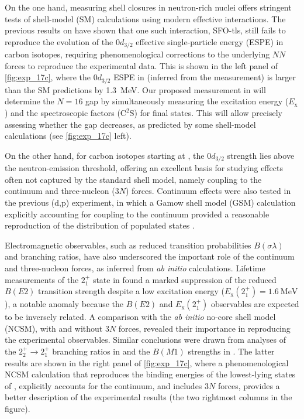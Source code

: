\documentclass[a4paper, 10pt]{article}
\newcommand{\iso}[2]{\ce{^{#1}#2}}
\newcommand{\ex}{\ensuremath{E_{\text{x}}}\xspace}
\newcommand{\ctwos}{\ensuremath{\text{C}^2\text{S}}\xspace}
\begin{document}
On the one hand, measuring shell closures in neutron-rich nuclei offers stringent tests of shell-model (SM) calculations using modern effective interactions. The previous results on \iso{17}{C} have shown that one such interaction, SFO-tls, still fails to reproduce the evolution of the $0d_{3/2}$ effective single-particle energy (ESPE) in carbon isotopes, requiring phenomenological corrections to the underlying $NN$ forces to reproduce the experimental data. This is shown in the left panel of \autoref{fig:exp_17c}, where the $0d_{3/2}$ ESPE in \iso{16}{C} (inferred from the \iso{17}{C} measurement) is larger than the SM predictions by \qty{1.3}{\MeV}. Our proposed measurement in \iso{18}{C} will determine the $N=16$ gap by simultaneously measuring the excitation energy (\ex) and the spectroscopic factors (\ctwos) for final states. This will allow precisely assessing whether the gap decreases, as predicted by some shell-model calculations (see \autoref{fig:exp_17c} left).

On the other hand, for carbon isotopes starting at \iso{15}{C}, the $0d_{3/2}$ strength lies above the neutron-emission threshold, offering an excellent basis for studying effects often not captured by the standard shell model, namely coupling to the continuum and three-nucleon ($3N$) forces. Continuum effects were also tested in the previous \iso{16}{C}(d,p)\iso{17}{C} experiment, in which a Gamow shell model (GSM) calculation explicitly accounting for coupling to the continuum provided a reasonable reproduction of the distribution of populated states \cite{lois-fuentes2025}.

Electromagnetic observables, such as reduced transition probabilities $B(\sigma\lambda)$ and branching ratios, have also underscored the important role of the continuum and three-nucleon forces, as inferred from \textit{ab initio} calculations. Lifetime measurements of the $2^+_1$ state in \iso{18}{C} \cite{voss2012} found a marked suppression of the reduced $B(E2)$ transition strength despite a low excitation energy ($\ex(2^+_1)=\qty{1.6}{\MeV}$), a notable anomaly because the $B(E2)$ and $\ex(2^+_1)$ observables are expected to be inversely related. A comparison with the \textit{ab initio} no-core shell model (NCSM), with and without $3N$ forces, revealed their importance in reproducing the experimental observables. Similar conclusions were drawn from analyses of the $2^+_2\rightarrow2^+_1$ branching ratios in \iso{16}{C} \cite{petri2012} and the $B(M1)$ strengths in \iso{17}{C} \cite{smalley2015}. The latter results are shown in the right panel of \autoref{fig:exp_17c}, where a phenomenological NCSM calculation that reproduces the binding energies of the lowest-lying states of \iso{17}{C}, explicitly accounts for the continuum, and includes $3N$ forces, provides a better description of the experimental results (the two rightmost columns in the figure).
\end{document}
